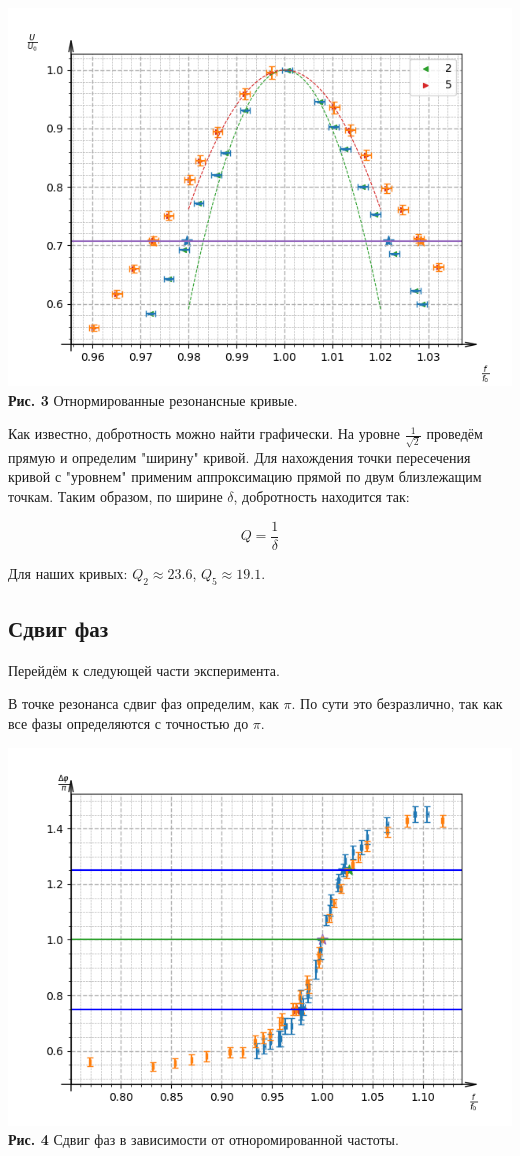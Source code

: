 \documentclass[a4paper, 12pt]{article}%
\begin{document}
\begin{center}
\includegraphics[width=\textwidth]{Figure_2.png}\\
\textbf{Рис. 3} Отнормированные резонансные кривые.
\end{center}

Как известно, добротность можно найти графически. На уровне $\frac{1}{\sqrt{2}}$ проведём прямую и определим "ширину" кривой. Для нахождения точки пересечения кривой с "уровнем" применим аппроксимацию прямой по двум близлежащим точкам. Таким образом, по ширине $\delta$, добротность находится так:

\[Q=\frac{1}{\delta}\]


Для наших кривых:
$Q_2 \approx 23.6$, 
$Q_5 \approx 19.1$.
\subsection*{Сдвиг фаз}
Перейдём к следующей части эксперимента. %

В точке резонанса сдвиг фаз определим, как $\pi$. По сути это безразлично, так как все фазы определяются с точностью до $\pi$.

\begin{center}
\includegraphics[width=\textwidth]{Figure_3.png}\\
\textbf{Рис. 4} Сдвиг фаз в зависимости от отноромированной частоты.
\end{center}
\end{document}
